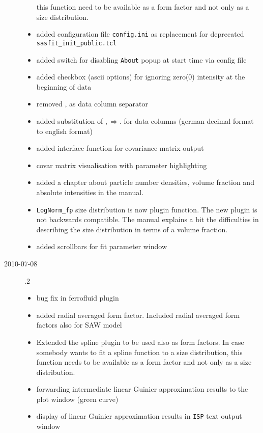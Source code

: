 \begin{description}
\begin{itemize}
            this function need to be available as a form factor and not only as a size
            distribution.
        \item added configuration file \texttt{config.ini} as replacement for
            deprecated \texttt{sasfit\_init\_public.tcl}
        \item added switch for disabling \texttt{About} popup at start time via config file
        \item added checkbox (ascii options) for ignoring zero(0) intensity at the beginning
                of data
        \item removed , as data column separator
        \item added substitution of $, \Rightarrow .$   for data columns
                (german decimal format to english format)
        \item added interface function for covariance matrix output
        \item covar matrix visualisation with parameter highlighting
        \item added a chapter about particle number densities, volume fraction
            and absolute intensities in the manual.
        \item \texttt{LogNorm\_fp} size distribution is now plugin function.
            The new plugin is not backwards compatible.
            The manual explains a bit the difficulties in describing the size distribution
            in terms of a volume fraction.
        \item added scrollbars for fit parameter window
        \end{itemize}
    \item[2010-07-08] .2
        \begin{itemize}
        \item bug fix in ferrofluid plugin
        \item added radial averaged form factor. Included radial averaged form factors also for SAW model
        \item Extended the spline plugin to be used also as form factors. In case somebody wants to fit a spline function to a size distribution, this function needs to be available as a form factor and not only as a size distribution.
        \item forwarding intermediate linear Guinier approximation results to the plot window (green curve)
        \item display of linear Guinier approximation results in \texttt{ISP} text output window

\end{itemize}
\end{description}
